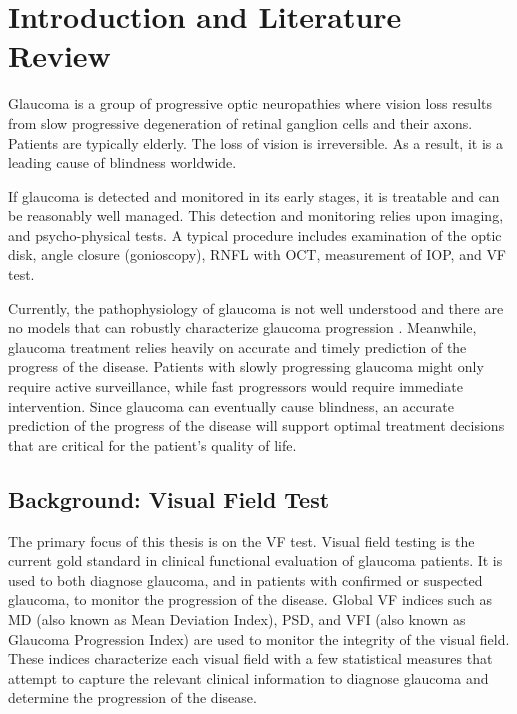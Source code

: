 \chapter{Introduction and Literature Review}

Glaucoma is a group of progressive optic neuropathies where vision loss results from slow progressive degeneration of retinal ganglion cells and their axons. \cite{Weinreb2004} Patients are typically elderly. The loss of vision is irreversible. As a result, it is a leading cause of blindness worldwide. 

If glaucoma is detected and monitored in its early stages, it is treatable and can be reasonably well managed. This detection and monitoring relies upon imaging, and psycho-physical tests. A typical procedure includes examination of the optic disk, angle closure (gonioscopy), \ac{RNFL} with \ac{OCT}, measurement of \ac{IOP}, and \acl{VF} test.

Currently, the pathophysiology of glaucoma is not well understood and there are no models that can robustly characterize glaucoma progression \cite{Chen2014}. Meanwhile, glaucoma treatment relies heavily on accurate and timely prediction of the progress of the disease. Patients with slowly progressing glaucoma might only require active surveillance, while fast progressors would require immediate intervention. Since glaucoma can eventually cause blindness, an accurate prediction of the progress of the disease will support optimal treatment decisions that are critical for the patient's quality of life.  

\section{Background: Visual Field Test}

The primary focus of this thesis is on the \acl{VF} test. Visual field testing is the current gold standard in clinical functional evaluation of glaucoma patients. It is used to both diagnose glaucoma, and in patients with confirmed or suspected glaucoma, to monitor the progression of the disease. Global \acl{VF} indices such as \ac{MD} (also known as Mean Deviation Index), \ac{PSD}, and \ac{VFI} (also known as Glaucoma Progression Index) are used to monitor the integrity of the visual field. These indices characterize each visual field with a few statistical measures that attempt to capture the relevant clinical information to diagnose glaucoma and determine the progression of the disease. 

